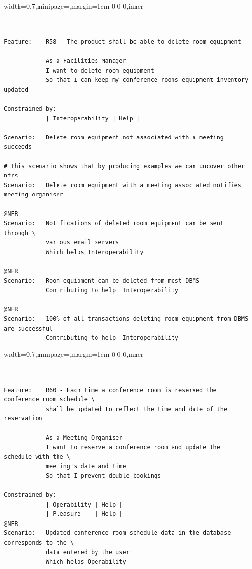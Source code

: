 \documentclass[dissertation,final]{softeng}
\newenvironment{featurecode}[1]
{ \lrbox\featurebox \begin{adjustbox}{width=#1\textwidth,minipage=\textwidth,margin=1cm 0 0 0,inner} }
{ \end{adjustbox}\endlrbox}
\newenvironment{featurelist}[2]
{
\newcommand{\setcaption}{\caption{#1}}
\newcommand{\setlabel}{\label{#2}}
}
{\begin{listing}[h!]\centering\usebox\featurebox\setcaption\setlabel\end{listing}}
\begin{document}
\begin{appendices}
\begin{featurelist}{R58 -- The product shall be able to delete room equipment}{lst:feature_r58}
\begin{featurecode}{0.7}
\begin{verbatim}


Feature:    R58 - The product shall be able to delete room equipment

            As a Facilities Manager
            I want to delete room equipment
            So that I can keep my conference rooms equipment inventory updated
	
Constrained by:
            | Interoperability | Help |

Scenario:   Delete room equipment not associated with a meeting succeeds

# This scenario shows that by producing examples we can uncover other nfrs
Scenario:   Delete room equipment with a meeting associated notifies meeting organiser

@NFR
Scenario:   Notifications of deleted room equipment can be sent through \
            various email servers	
            Which helps Interoperability

@NFR	
Scenario:   Room equipment can be deleted from most DBMS
            Contributing to help  Interoperability

@NFR
Scenario:   100% of all transactions deleting room equipment from DBMS are successful
            Contributing to help  Interoperability
\end{verbatim}
\end{featurecode}
\end{featurelist}
\clearpage

\begin{featurelist}{R60 -- Each time a conference room is reserved the schedule shall be updated}{lst:feature_r60}
\begin{featurecode}{0.7}
\begin{verbatim}


Feature:    R60 - Each time a conference room is reserved the conference room schedule \
            shall be updated to reflect the time and date of the reservation

            As a Meeting Organiser
            I want to reserve a conference room and update the schedule with the \
            meeting's date and time
            So that I prevent double bookings

Constrained by:
            | Operability | Help |
            | Pleasure    | Help |
@NFR	
Scenario:   Updated conference room schedule data in the database corresponds to the \
            data entered by the user
            Which helps Operability


\end{verbatim}
\end{featurecode}
\end{featurelist}
\end{appendices}
\end{document}
